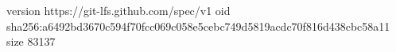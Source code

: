 version https://git-lfs.github.com/spec/v1
oid sha256:a6492bd3670c594f70fcc069c058e5cebc749d5819acdc70f816d438cbc58a11
size 83137

